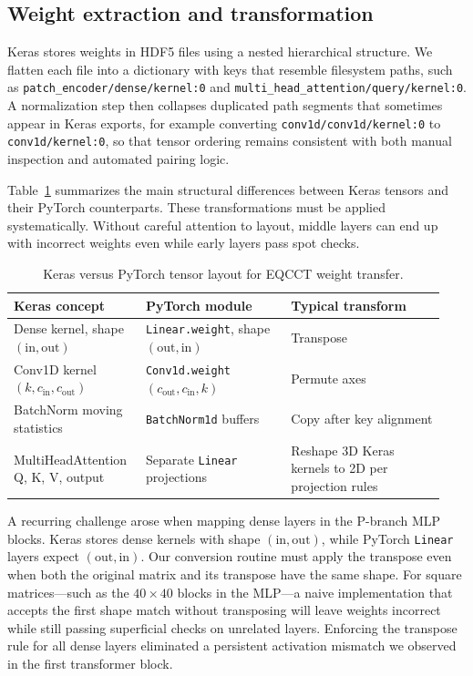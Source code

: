 \subsection{Weight extraction and transformation}

Keras stores weights in HDF5 files using a nested hierarchical structure. We flatten each file into a dictionary with keys that resemble filesystem paths, such as \texttt{patch\_encoder/dense/kernel:0} and \texttt{multi\_head\_attention/query/kernel:0}. A normalization step then collapses duplicated path segments that sometimes appear in Keras exports, for example converting \texttt{conv1d/conv1d/kernel:0} to \texttt{conv1d/kernel:0}, so that tensor ordering remains consistent with both manual inspection and automated pairing logic.

Table~\ref{tab:keras-pt} summarizes the main structural differences between Keras tensors and their PyTorch counterparts. These transformations must be applied systematically. Without careful attention to layout, middle layers can end up with incorrect weights even while early layers pass spot checks.

\begin{table}[htbp]
  \centering
  \caption{Keras versus PyTorch tensor layout for EQCCT weight transfer.}
  \label{tab:keras-pt}
  \begin{tabular}{@{}p{0.28\linewidth}p{0.32\linewidth}p{0.34\linewidth}@{}}
    \toprule
    \textbf{Keras concept} & \textbf{PyTorch module} & \textbf{Typical transform} \\
    \midrule
    Dense kernel, shape $(\mathrm{in},\mathrm{out})$ & \texttt{Linear.weight}, shape $(\mathrm{out},\mathrm{in})$ & Transpose \\
    Conv1D kernel $(k,c_{\mathrm{in}},c_{\mathrm{out}})$ & \texttt{Conv1d.weight} $(c_{\mathrm{out}},c_{\mathrm{in}},k)$ & Permute axes \\
    BatchNorm moving statistics & \texttt{BatchNorm1d} buffers & Copy after key alignment \\
    MultiHeadAttention Q, K, V, output & Separate \texttt{Linear} projections & Reshape 3D Keras kernels to 2D per projection rules \\
    \bottomrule
  \end{tabular}
\end{table}

A recurring challenge arose when mapping dense layers in the P-branch MLP blocks. Keras stores dense kernels with shape $(\mathrm{in},\mathrm{out})$, while PyTorch \texttt{Linear} layers expect $(\mathrm{out},\mathrm{in})$. Our conversion routine must apply the transpose even when both the original matrix and its transpose have the same shape. For square matrices---such as the $40\times 40$ blocks in the MLP---a naive implementation that accepts the first shape match without transposing will leave weights incorrect while still passing superficial checks on unrelated layers. Enforcing the transpose rule for all dense layers eliminated a persistent activation mismatch we observed in the first transformer block.

